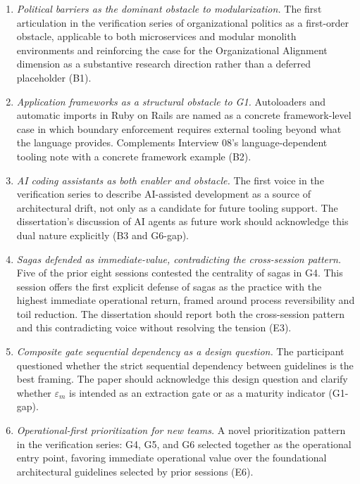 \begin{enumerate}[itemsep=3pt,topsep=2pt]
  \item \emph{Political barriers as the dominant obstacle to modularization.} The first articulation in the verification series of organizational politics as a first-order obstacle, applicable to both microservices and modular monolith environments and reinforcing the case for the Organizational Alignment dimension as a substantive research direction rather than a deferred placeholder (B1).
  \item \emph{Application frameworks as a structural obstacle to G1.} Autoloaders and automatic imports in Ruby on Rails are named as a concrete framework-level case in which boundary enforcement requires external tooling beyond what the language provides. Complements Interview 08's language-dependent tooling note with a concrete framework example (B2).
  \item \emph{AI coding assistants as both enabler and obstacle.} The first voice in the verification series to describe AI-assisted development as a source of architectural drift, not only as a candidate for future tooling support. The dissertation's discussion of AI agents as future work should acknowledge this dual nature explicitly (B3 and G6-gap).
  \item \emph{Sagas defended as immediate-value, contradicting the cross-session pattern.} Five of the prior eight sessions contested the centrality of sagas in G4. This session offers the first explicit defense of sagas as the practice with the highest immediate operational return, framed around process reversibility and toil reduction. The dissertation should report both the cross-session pattern and this contradicting voice without resolving the tension (E3).
  \item \emph{Composite gate sequential dependency as a design question.} The participant questioned whether the strict sequential dependency between guidelines is the best framing. The paper should acknowledge this design question and clarify whether $\varepsilon_m$ is intended as an extraction gate or as a maturity indicator (G1-gap).
  \item \emph{Operational-first prioritization for new teams.} A novel prioritization pattern in the verification series: G4, G5, and G6 selected together as the operational entry point, favoring immediate operational value over the foundational architectural guidelines selected by prior sessions (E6).
\end{enumerate}

